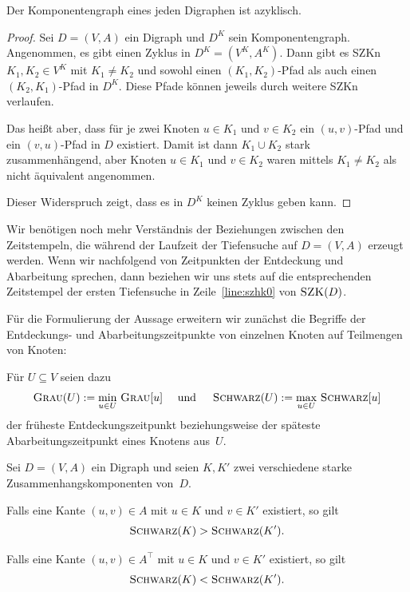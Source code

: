 \begin{prop}\label{prop:kompgraph-azyklisch}
	Der Komponentengraph eines jeden Digraphen ist azyklisch. 
\end{prop}
\begin{proof}
Sei $D=(V,A)$ ein Digraph und $D^K$ sein Komponentengraph.
Angenommen, es gibt einen Zyklus in $D^K=(V^K,A^K)$.
Dann gibt es SZKn $K_1,K_2 \in V^K$ mit $K_1 \neq K_2$ und sowohl einen $(K_1,K_2)$-Pfad als auch einen $(K_2,K_1)$-Pfad in $D^K$.
Diese Pfade können jeweils durch weitere SZKn verlaufen.

Das heißt aber, dass für je zwei Knoten $u \in K_1$ und $v \in K_2$ ein $(u,v)$-Pfad und ein $(v,u)$-Pfad in $D$ existiert.
Damit ist dann $K_1 \cup K_2$ stark zusammenhängend, aber Knoten $u \in K_1$ und $v \in K_2$ waren mittels $K_1 \neq K_2$ als nicht äquivalent angenommen.

Dieser Widerspruch zeigt, dass es in $D^K$ keinen Zyklus geben kann.
\end{proof}

\begin{bem}
Wir benötigen noch mehr Verständnis der Beziehungen zwischen den Zeitstempeln, die während der Laufzeit der Tiefensuche auf $D=(V,A)$ erzeugt werden.
Wenn wir nachfolgend von Zeitpunkten der Entdeckung und Abarbeitung sprechen, dann beziehen wir uns stets auf die entsprechenden Zeitstempel der ersten Tiefensuche in Zeile~\ref{line:szhk0} von $\mathop{\text{\textsc{SZK}}}(D)$.

Für die Formulierung der Aussage erweitern wir zunächst die Begriffe der Entde\-ckungs- und Abarbeitungszeitpunkte von einzelnen Knoten auf Teilmengen von Knoten:

Für $U \subseteq V$ seien dazu
\[
\mathop{\text{\textsc{Grau}}}(U) := \min_{u \in U} \,\mathop{\text{\textsc{Grau}}}[u] \quad \text{ und } \quad\mathop{\text{\textsc{Schwarz}}}(U) := \max_{u \in U} \,\mathop{\text{\textsc{Schwarz}}}[u]
\]
der früheste Entdeckungszeitpunkt beziehungsweise der späteste Abarbeitungszeitpunkt eines Knotens aus~$U$.
\end{bem}

\begin{lem}
\label{lem:komponenten-zeitpunkte}
Sei $D=(V,A)$ ein Digraph und seien $K,K'$ zwei verschiedene starke Zusammenhangskomponenten von~$D$.
\begin{enuma}
 \item\label{lem:komponenten-zeitpunkte:primal} Falls eine Kante $(u,v) \in A$ mit $u \in K$ und $v \in K'$ existiert, so gilt
 \[
 \mathop{\text{\textsc{Schwarz}}}(K) > \mathop{\text{\textsc{Schwarz}}}(K').
 \]
 
 \item\label{lem:komponenten-zeitpunkte:transponiert} Falls eine Kante $(u,v) \in A^\top$ mit $u \in K$ und $v \in K'$ existiert, so gilt
 \[
 \mathop{\text{\textsc{Schwarz}}}(K) < \mathop{\text{\textsc{Schwarz}}}(K').
 \]
\end{enuma}
\end{lem}

